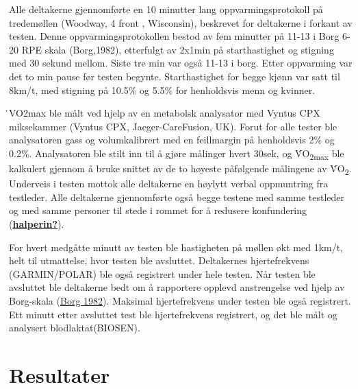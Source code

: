 \documentclass[
]{book}
\begin{document}
Alle deltakerne gjennomførte en 10 minutter lang oppvarmingsprotokoll på
tredemøllen (Woodway, 4 front , Wisconsin), beskrevet for deltakerne i
forkant av testen. Denne oppvarmingsprotokollen bestod av fem minutter
på 11-13 i Borg 6-20 RPE skala (Borg,1982), etterfulgt av 2x1min på
starthastighet og stigning med 30 sekund mellom. Siste tre min var også
11-13 i borg. Etter oppvarming var det to min pause før testen begynte.
Starthastighet for begge kjønn var satt til 8km/t, med stigning på
10.5\% og 5.5\% for henholdsvis menn og kvinner.

̇VO2max ble målt ved hjelp av en metabolsk analysator med Vyntus CPX
miksekammer (Vyntus CPX, Jaeger-CareFusion, UK). Forut for alle tester
ble analysatoren gass og volumkalibrert med en feillmargin på
henholdsvis 2\% og 0.2\%. Analysatoren ble stilt inn til å gjøre
målinger hvert 30sek, og V̇O\textsubscript{2max} ble kalkulert gjennom å
bruke snittet av de to høyeste påfølgende målingene av
V̇O\textsubscript{2}. Underveis i testen mottok alle deltakerne en
høylytt verbal oppmuntring fra testleder. Alle deltakerne gjennomførte
også begge testene med samme testleder og med samme personer til stede i
rommet for å redusere konfundering
(\protect\hyperlink{ref-halperin}{\textbf{halperin?}}).

For hvert medgåtte minutt av testen ble hastigheten på møllen økt med
1km/t, helt til utmattelse, hvor testen ble avsluttet. Deltakernes
hjertefrekvens (GARMIN/POLAR) ble også registrert under hele testen. Når
testen ble avsluttet ble deltakerne bedt om å rapportere opplevd
anstrengelse ved hjelp av Borg-skala
(\protect\hyperlink{ref-borg1982}{Borg 1982}). Maksimal hjertefrekvens
under testen ble også registrert. Ett minutt etter avsluttet test ble
hjertefrekvens registrert, og det ble målt og analysert
blodlaktat(BIOSEN).

\hypertarget{resultater}{%
\section{Resultater}\label{resultater}}

\providecommand{\docline}[3]{\noalign{\global\setlength{\arrayrulewidth}{#1}}\arrayrulecolor[HTML]{#2}\cline{#3}}

\setlength{\tabcolsep}{2pt}

\renewcommand*{\arraystretch}{1.5}
\end{document}
